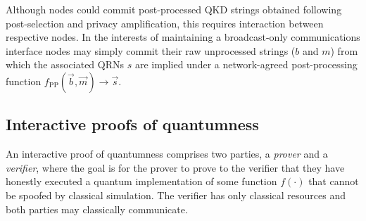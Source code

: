 Although nodes could commit post-processed QKD strings obtained following post-selection and privacy amplification, this requires interaction between respective nodes. In the interests of maintaining a broadcast-only communications interface nodes may simply commit their raw unprocessed strings ($b$ and $m$) from which the associated QRNs $s$ are implied under a network-agreed post-processing function $f_\mathrm{PP}(\vec{b},\vec{m})\to \vec{s}$.

\subsection{Interactive proofs of quantumness} \label{sec:IPQ}



%

An interactive proof of quantumness \cite{Liu22, Zhu23} comprises two parties, a \emph{prover} and a \emph{verifier}, where the goal is for the prover to prove to the verifier that they have honestly executed a quantum implementation of some function $f(\cdot)$ that cannot be spoofed by classical simulation. The verifier has only classical resources and both parties may classically communicate.

